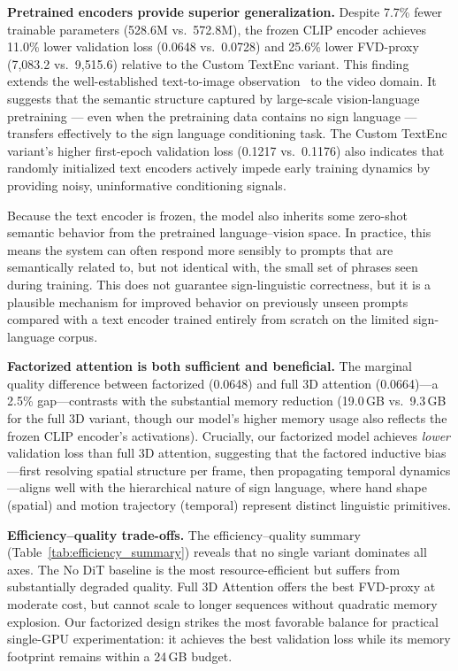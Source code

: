 \documentclass{ieeeaccess}
\begin{document}
\textbf{Pretrained encoders provide superior generalization.} Despite 7.7\% fewer trainable parameters (528.6M vs.\ 572.8M), the frozen CLIP encoder achieves 11.0\% lower validation loss (0.0648 vs.\ 0.0728) and 25.6\% lower FVD-proxy (7{,}083.2 vs.\ 9{,}515.6) relative to the Custom TextEnc variant. This finding extends the well-established text-to-image observation~\cite{rombach2022ldm} to the video domain. It suggests that the semantic structure captured by large-scale vision-language pretraining — even when the pretraining data contains no sign language — transfers effectively to the sign language conditioning task. The Custom TextEnc variant's higher first-epoch validation loss (0.1217 vs.\ 0.1176) also indicates that randomly initialized text encoders actively impede early training dynamics by providing noisy, uninformative conditioning signals.

Because the text encoder is frozen, the model also inherits some zero-shot semantic behavior from the pretrained language--vision space. In practice, this means the system can often respond more sensibly to prompts that are semantically related to, but not identical with, the small set of phrases seen during training. This does not guarantee sign-linguistic correctness, but it is a plausible mechanism for improved behavior on previously unseen prompts compared with a text encoder trained entirely from scratch on the limited sign-language corpus.

\textbf{Factorized attention is both sufficient and beneficial.} The marginal quality difference between factorized (0.0648) and full 3D attention (0.0664)---a 2.5\% gap---contrasts with the substantial memory reduction (19.0\,GB vs.\ 9.3\,GB for the full 3D variant, though our model's higher memory usage also reflects the frozen CLIP encoder's activations). Crucially, our factorized model achieves \emph{lower} validation loss than full 3D attention, suggesting that the factored inductive bias---first resolving spatial structure per frame, then propagating temporal dynamics---aligns well with the hierarchical nature of sign language, where hand shape (spatial) and motion trajectory (temporal) represent distinct linguistic primitives.

\textbf{Efficiency--quality trade-offs.} The efficiency--quality summary (Table~\ref{tab:efficiency_summary}) reveals that no single variant dominates all axes. The No DiT baseline is the most resource-efficient but suffers from substantially degraded quality. Full 3D Attention offers the best FVD-proxy at moderate cost, but cannot scale to longer sequences without quadratic memory explosion. Our factorized design strikes the most favorable balance for practical single-GPU experimentation: it achieves the best validation loss while its memory footprint remains within a 24\,GB budget.
\end{document}
